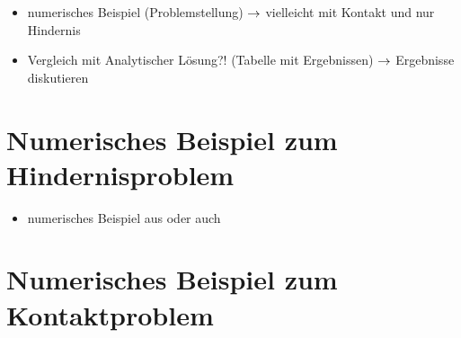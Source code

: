\label{kap:6}


\begin{itemize}
\item numerisches Beispiel (Problemstellung) $\rightarrow$ vielleicht mit Kontakt und nur Hindernis
\item Vergleich mit Analytischer Lösung?! (Tabelle mit Ergebnissen) $\rightarrow$ Ergebnisse diskutieren
\end{itemize}

\section{Numerisches Beispiel zum Hindernisproblem}
\label{kap:6.1}

\begin{itemize}
\item numerisches Beispiel aus \cite{SiebVee} oder auch \cite{BraeCar}
\end{itemize}


\section{Numerisches Beispiel zum Kontaktproblem}
\label{kap:6.2}




\newpage

